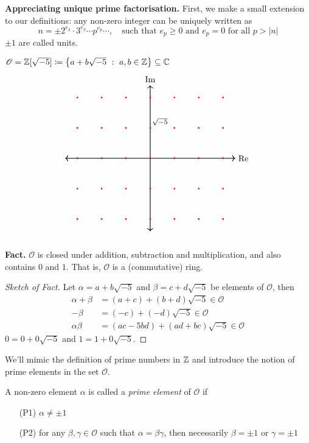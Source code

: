 \vspace*{1em}

{\bf\large Appreciating unique prime factorisation.} First, we make a small extension to our definitions: any non-zero integer can be uniquely written as
\[n = \pm 2^{e_2}\cdot 3^{e_3}\cdots p^{e_p}\cdots,\quad \text{such that $e_p \geq 0$ and $e_p = 0$ for all $p > |n|$}\]
$\pm 1$ are called units.

\vspace*{1em}

\begin{definition}
$\mathscr{O} = \mathbb Z[\sqrt{-5}] \coloneqq \left\{a+b\sqrt{-5}\ :\ a,b \in \mathbb Z\right\} \subseteq \mathbb C$
\[\begin{tikzpicture}
    \draw[<->,thick] (-3.5,0)--(3.5,0) node[right]{$\Re$};
	\draw[<->,thick] (0,-3)--(0,3) node[above]{$\Im$};
    \foreach \x in {-3,-2,-1,0,1,2,3}
    \foreach \y in {-2.5,-1.25,0,1.25,2.5}
    {
    \fill[red] (\x,\y) circle (1pt);
    }
    \node[] at (0.4,1.5) {{\footnotesize $\sqrt{-5}$}};
  \end{tikzpicture}\]
  \\
{\bf\large Fact.} $\mathscr{O}$ is closed under addition, subtraction and multiplication, and also contains $0$ and $1$. That is, $\mathscr{O}$ is a (commutative) ring.
\end{definition}
\begin{proof}[Sketch of Fact]
Let $\alpha = a + b\sqrt{-5}$ and $\beta = c + d\sqrt{-5}$ be elements of $\mathscr{O}$, then
\begin{align*}
\alpha + \beta &= (a + c) + (b + d)\sqrt{-5} \in \mathscr{O}\\[0.5em]
-\beta &= (-c) + (-d)\sqrt{-5} \in \mathscr{O}\\[0.5em]
\alpha\beta &= (ac - 5bd) + (ad + bc)\sqrt{-5} \in \mathscr{O}
\end{align*}
$0 = 0 + 0\sqrt{-5}$ and $1 = 1 + 0\sqrt{-5}$.
\end{proof}


We'll mimic the definition of prime numbers in $\mathbb Z$ and introduce the notion of prime elements in the set $\mathscr{O}$.

\vspace*{1em}

\begin{definition}
A non-zero element $\alpha$ is called a \emph{prime element} of $\mathscr{O}$ if
\begin{itemize}
\item[(P1)] $\alpha \neq \pm 1$
\item[(P2)] for any $\beta,\gamma \in \mathscr{O}$ such that $\alpha = \beta\gamma$, then necessarily $\beta = \pm 1$ or $\gamma = \pm 1$
\end{itemize}
\end{definition}

